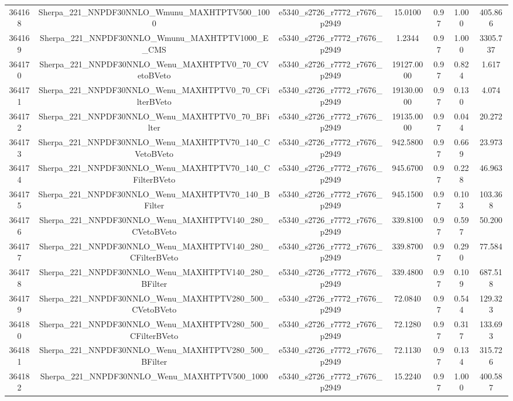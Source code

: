 \begin{table}[htbp]
\begin{center}
{\begin{tabular}{ccccccc}
364168 & Sherpa\_221\_NNPDF30NNLO\_Wmunu\_MAXHTPTV500\_1000 & e5340\_s2726\_r7772\_r7676\_p2949 & 15.0100 & 0.97 & 1.000 & 405.866 \\ 
364169 & Sherpa\_221\_NNPDF30NNLO\_Wmunu\_MAXHTPTV1000\_E\_CMS & e5340\_s2726\_r7772\_r7676\_p2949 & 1.2344 & 0.97 & 1.000 & 3305.737 \\ 
364170 & Sherpa\_221\_NNPDF30NNLO\_Wenu\_MAXHTPTV0\_70\_CVetoBVeto & e5340\_s2726\_r7772\_r7676\_p2949 & 19127.0000 & 0.97 & 0.824 & 1.617 \\ 
364171 & Sherpa\_221\_NNPDF30NNLO\_Wenu\_MAXHTPTV0\_70\_CFilterBVeto & e5340\_s2726\_r7772\_r7676\_p2949 & 19130.0000 & 0.97 & 0.130 & 4.074 \\ 
364172 & Sherpa\_221\_NNPDF30NNLO\_Wenu\_MAXHTPTV0\_70\_BFilter & e5340\_s2726\_r7772\_r7676\_p2949 & 19135.0000 & 0.97 & 0.044 & 20.272 \\ 
364173 & Sherpa\_221\_NNPDF30NNLO\_Wenu\_MAXHTPTV70\_140\_CVetoBVeto & e5340\_s2726\_r7772\_r7676\_p2949 & 942.5800 & 0.97 & 0.669 & 23.973 \\ 
364174 & Sherpa\_221\_NNPDF30NNLO\_Wenu\_MAXHTPTV70\_140\_CFilterBVeto & e5340\_s2726\_r7772\_r7676\_p2949 & 945.6700 & 0.97 & 0.228 & 46.963 \\ 
364175 & Sherpa\_221\_NNPDF30NNLO\_Wenu\_MAXHTPTV70\_140\_BFilter & e5340\_s2726\_r7772\_r7676\_p2949 & 945.1500 & 0.97 & 0.103 & 103.368 \\ 
364176 & Sherpa\_221\_NNPDF30NNLO\_Wenu\_MAXHTPTV140\_280\_CVetoBVeto & e5340\_s2726\_r7772\_r7676\_p2949 & 339.8100 & 0.97 & 0.597 & 50.200 \\ 
364177 & Sherpa\_221\_NNPDF30NNLO\_Wenu\_MAXHTPTV140\_280\_CFilterBVeto & e5340\_s2726\_r7772\_r7676\_p2949 & 339.8700 & 0.97 & 0.290 & 77.584 \\ 
364178 & Sherpa\_221\_NNPDF30NNLO\_Wenu\_MAXHTPTV140\_280\_BFilter & e5340\_s2726\_r7772\_r7676\_p2949 & 339.4800 & 0.97 & 0.109 & 687.518 \\ 
364179 & Sherpa\_221\_NNPDF30NNLO\_Wenu\_MAXHTPTV280\_500\_CVetoBVeto & e5340\_s2726\_r7772\_r7676\_p2949 & 72.0840 & 0.97 & 0.544 & 129.323 \\ 
364180 & Sherpa\_221\_NNPDF30NNLO\_Wenu\_MAXHTPTV280\_500\_CFilterBVeto & e5340\_s2726\_r7772\_r7676\_p2949 & 72.1280 & 0.97 & 0.317 & 133.693 \\ 
364181 & Sherpa\_221\_NNPDF30NNLO\_Wenu\_MAXHTPTV280\_500\_BFilter & e5340\_s2726\_r7772\_r7676\_p2949 & 72.1130 & 0.97 & 0.134 & 315.726 \\ 
364182 & Sherpa\_221\_NNPDF30NNLO\_Wenu\_MAXHTPTV500\_1000 & e5340\_s2726\_r7772\_r7676\_p2949 & 15.2240 & 0.97 & 1.000 & 400.587 \\ 

\end{tabular}}
\end{center}
\end{table}

